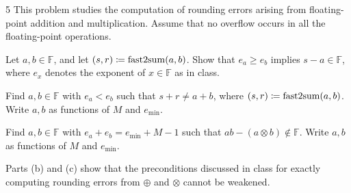 \documentclass[11pt,oneside]{article}
\begin{document}
\begin{problem}{5}
This problem studies the computation of rounding errors arising from
floating-point addition and multiplication. Assume that no overflow
occurs in all the floating-point operations.
\begin{problemsubparts}
\item Let $a, b\in\mathbb F$, and let
$(s, r)\coloneqq\operatorname{fast2sum}(a, b)$. Show that
$e_a\ge e_b$ implies $s-a\in\mathbb F$, where $e_x$
denotes the exponent of $x\in\mathbb F$ as in class.
\item Find $a, b\in\mathbb F$ with $e_a<e_b$ such that
$s+r\ne a+b$, where $(s, r)\coloneqq\operatorname{fast2sum}(a, b)$.
Write $a, b$ as functions of $M$ and $e_{\min}$.
\item Find $a, b\in\mathbb F$ with
$e_a+e_b=e_{\min}+M-1$ such that
$ab-(a\otimes b)\notin\mathbb F$.
Write $a, b$ as functions of $M$ and $e_{\min}$.
\end{problemsubparts}
\begin{remark}
Parts (b) and (c) show that the preconditions discussed in class for
exactly computing rounding errors from $\oplus$ and $\otimes$
cannot be weakened.
\end{remark}
\end{problem}
\end{document}
